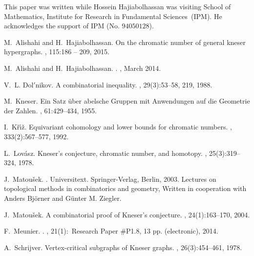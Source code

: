 \documentclass[11pt]{article}
\begin{document}
This paper was written while Hossein Hajiabolhassan was visiting School of Mathematics, Institute for Research in Fundamental Sciences~(IPM).
He acknowledges the support of IPM (No. $94050128$).

\def\cprime{$'$} \def\cprime{$'$}
\begin{thebibliography}{10}

M.~Alishahi and H.~Hajiabolhassan.
\newblock On the chromatic number of general kneser hypergraphs.
, 115:186 -- 209,
  2015.

M.~{Alishahi} and H.~{Hajiabolhassan}.
.
, March 2014.

V.~L. Dol{\cprime}nikov.
\newblock A combinatorial inequality.
, 29(3):53--58, 219, 1988.

M.~Kneser.
\newblock Ein {S}atz \"uber abelsche {G}ruppen mit {A}nwendungen auf die
  {G}eometrie der {Z}ahlen.
, 61:429--434, 1955.

I.~K{\v{r}}{\'{\i}}{\v{z}}.
\newblock Equivariant cohomology and lower bounds for chromatic numbers.
, 333(2):567--577, 1992.

L.~Lov{\'a}sz.
\newblock Kneser's conjecture, chromatic number, and homotopy.
, 25(3):319--324, 1978.

J.~Matou{\v{s}}ek.
.
\newblock Universitext. Springer-Verlag, Berlin, 2003.
\newblock Lectures on topological methods in combinatorics and geometry,
  Written in cooperation with Anders Bj{\"o}rner and G{\"u}nter M. Ziegler.

J.~Matou{\v{s}}ek.
\newblock A combinatorial proof of {K}neser's conjecture.
, 24(1):163--170, 2004.

F.~{Meunier}.
.
, 21(1):\ Research Paper \#P1.8, 13 pp.
  (electronic), 2014.

A.~Schrijver.
\newblock Vertex-critical subgraphs of {K}neser graphs.
, 26(3):454--461, 1978.

\end{thebibliography}
\end{document}
